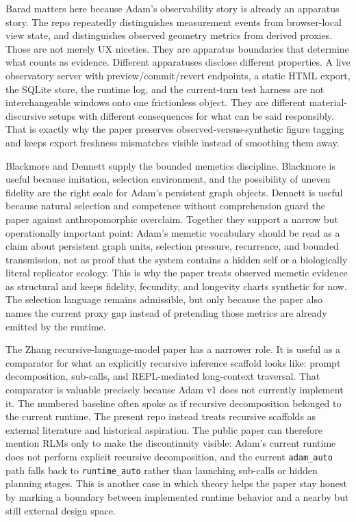 \documentclass[10pt]{article}
\begin{document}
Barad matters here because Adam's observability story is already an apparatus story.\cite{barad2007} The repo repeatedly distinguishes measurement events from browser-local view state, and distinguishes observed geometry metrics from derived proxies. Those are not merely UX niceties. They are apparatus boundaries that determine what counts as evidence. Different apparatuses disclose different properties. A live observatory server with preview/commit/revert endpoints, a static HTML export, the SQLite store, the runtime log, and the current-turn test harness are not interchangeable windows onto one frictionless object. They are different material-discursive setups with different consequences for what can be said responsibly. That is exactly why the paper preserves observed-versus-synthetic figure tagging and keeps export freshness mismatches visible instead of smoothing them away.

Blackmore and Dennett supply the bounded memetics discipline.\cite{blackmore1999,dennett2017} Blackmore is useful because imitation, selection environment, and the possibility of uneven fidelity are the right scale for Adam's persistent graph objects. Dennett is useful because natural selection and competence without comprehension guard the paper against anthropomorphic overclaim. Together they support a narrow but operationally important point: Adam's memetic vocabulary should be read as a claim about persistent graph units, selection pressure, recurrence, and bounded transmission, not as proof that the system contains a hidden self or a biologically literal replicator ecology. This is why the paper treats observed memetic evidence as structural and keeps fidelity, fecundity, and longevity charts synthetic for now. The selection language remains admissible, but only because the paper also names the current proxy gap instead of pretending those metrics are already emitted by the runtime.

The Zhang recursive-language-model paper has a narrower role.\cite{zhang2026} It is useful as a comparator for what an explicitly recursive inference scaffold looks like: prompt decomposition, sub-calls, and REPL-mediated long-context traversal. That comparator is valuable precisely because Adam v1 does not currently implement it. The numbered baseline often spoke as if recursive decomposition belonged to the current runtime. The present repo instead treats recursive scaffolds as external literature and historical aspiration. The public paper can therefore mention RLMs only to make the discontinuity visible: Adam's current runtime does not perform explicit recursive decomposition, and the current \texttt{adam\_auto} path falls back to \texttt{runtime\_auto} rather than launching sub-calls or hidden planning stages. This is another case in which theory helps the paper stay honest by marking a boundary between implemented runtime behavior and a nearby but still external design space.
\end{document}
